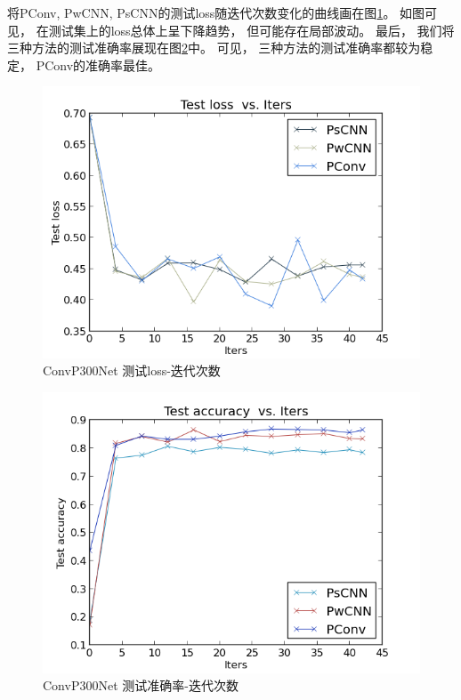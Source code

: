 将PConv, PwCNN, PsCNN的测试loss随迭代次数变化的曲线画在图\ref{fig:test_loss}。 如图可见， 在测试集上的loss总体上呈下降趋势， 但可能存在局部波动。 最后， 我们将三种方法的测试准确率展现在图\ref{fig:test_acc}中。 可见， 三种方法的测试准确率都较为稳定， PConv的准确率最佳。


\begin{figure}[htb]
  \centering
  \includegraphics[scale=0.9]{Pictures/CNN/test_loss.png}
  \caption{ConvP300Net 测试loss-迭代次数}\label{fig:test_loss}
\end{figure}

\begin{figure}[htb]
  \centering
  \includegraphics[scale=0.9]{Pictures/CNN/test_accuracy.png}
  \caption{ConvP300Net 测试准确率-迭代次数}\label{fig:test_acc}
\end{figure}




